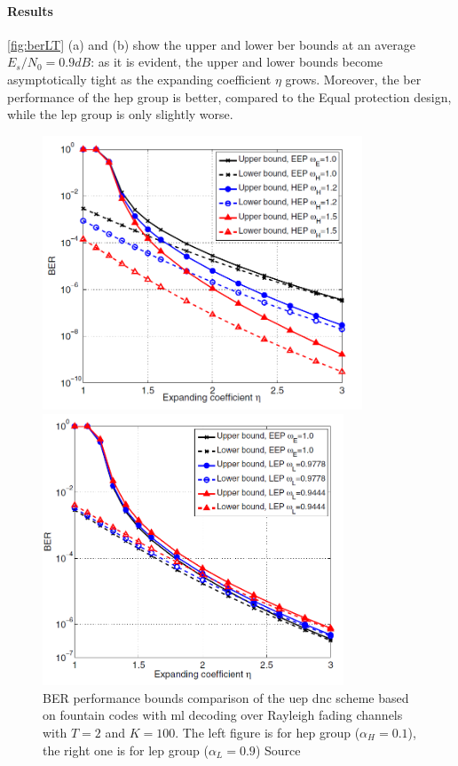 \paragraph{Results}
\autoref{fig:berLT} (a) and (b) show the upper and lower \gls{ber} bounds at an average $E_s/N_0 = 0.9dB$: as it is evident, the upper and lower bounds become asymptotically tight as the expanding coefficient $\eta$ grows. Moreover, the \gls{ber} performance of the \gls{hep} group is better, compared to the Equal protection design, while the \gls{lep} group is only slightly worse.\cite{Yue2014}
\begin{figure}
\centering
\begin{minipage}[c]{0.47\textwidth}
  \includegraphics[width = 0.85\textwidth]{img/bounds_14a}
\end{minipage}
\begin{minipage}[c]{0.47\textwidth}
  \includegraphics[width = 0.8\textwidth]{img/bounds_14b}
\end{minipage}
\caption{\footnotesize{BER performance bounds comparison of the \gls{uep} \gls{dnc} scheme based on fountain codes with \gls{ml} decoding over Rayleigh fading channels with $T=2$ and $K=100$. The left figure is for \gls{hep} group ($\alpha_H = 0.1$), the right one is for \gls{lep} group ($\alpha_L = 0.9$) Source \cite{Yue2014}}}
\label{fig:berLT}
\end{figure}
